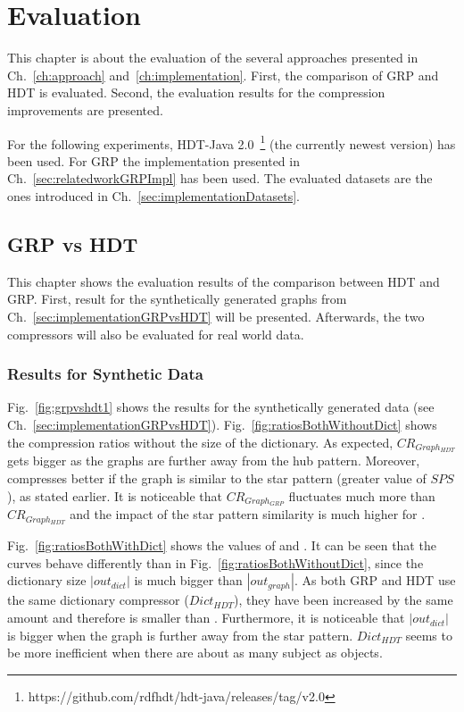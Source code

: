 \chapter{Evaluation}\label{ch:evaluation}

This chapter is about the evaluation of the several approaches presented in Ch.~\ref{ch:approach} and~\ref{ch:implementation}.  First, the comparison of GRP and HDT is evaluated. Second, the evaluation results for the compression improvements are presented.

For the following experiments, HDT-Java 2.0~\footnote{\label{foot:1}https://github.com/rdfhdt/hdt-java/releases/tag/v2.0} (the currently newest version) has been used. For GRP the implementation presented in Ch.~\ref{sec:relatedworkGRPImpl} has been used. The evaluated datasets are the ones introduced in Ch.~\ref{sec:implementationDatasets}.

\section{GRP vs HDT}\label{sec:evaluationHDTvsGRP}

This chapter shows the evaluation results of the comparison between HDT and GRP. First, result for the synthetically generated graphs from Ch.~\ref{sec:implementationGRPvsHDT} will be presented. Afterwards, the two compressors will also be evaluated for real world data.


\subsection{Results for Synthetic Data}

Fig.~\ref{fig:grpvshdt1} shows the results for the synthetically generated data (see Ch.~\ref{sec:implementationGRPvsHDT}). Fig.~\ref{fig:ratiosBothWithoutDict} shows the compression ratios without the size of the dictionary. As expected, $CR_{Graph_{HDT}}$ gets bigger as the graphs are further away from the hub pattern. Moreover, \GGRP{} compresses better if the graph is similar to the star pattern (greater value of $SPS$), as stated earlier. It is noticeable that $CR_{Graph_{GRP}}$ fluctuates much more than $CR_{Graph_{HDT}}$ and the impact of the star pattern similarity is much higher for \GGRP{}.

Fig.~\ref{fig:ratiosBothWithDict} shows the values of  and . It can be seen that the curves behave differently than in Fig.~\ref{fig:ratiosBothWithoutDict}, since the dictionary size $|out_{dict}|$ is much bigger than $|out_{graph}|$. As both GRP and HDT use the same dictionary compressor ($Dict_{HDT}$), they have been increased by the same amount and therefore  is smaller than . Furthermore, it is noticeable that $|out_{dict}|$ is bigger when the graph is further away from the star pattern. $Dict_{HDT}$ seems to be more inefficient when there are about as many subject as objects. 


